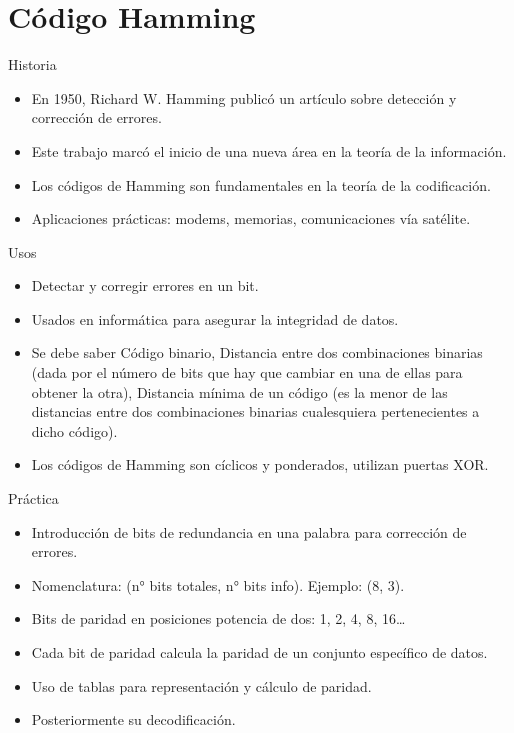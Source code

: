 \documentclass[presentation]{beamer}
\begin{document}
\section{Código Hamming}
\label{sec:orgc25531d}

\begin{frame}[label={sec:org75c1411}]{Historia}
\begin{itemize}
\item En 1950, Richard W. Hamming publicó un artículo sobre detección y corrección de errores.
\item Este trabajo marcó el inicio de una nueva área en la teoría de la información.
\item Los códigos de Hamming son fundamentales en la teoría de la codificación.
\item Aplicaciones prácticas: modems, memorias, comunicaciones vía satélite.
\end{itemize}
\end{frame}

\begin{frame}[label={sec:org9f31c41}]{Usos}
\begin{itemize}
\item Detectar y corregir errores en un bit.
\item Usados en informática para asegurar la integridad de datos.
\item Se debe saber Código binario, Distancia entre dos combinaciones binarias (dada por el número de bits que hay que cambiar en una de ellas para obtener la otra), Distancia mínima de un código (es la menor de las distancias entre dos combinaciones binarias cualesquiera pertenecientes a dicho código).
\item Los códigos de Hamming son cíclicos y ponderados, utilizan puertas XOR.
\end{itemize}
\end{frame}

\begin{frame}[label={sec:orgf139804}]{Práctica}
\begin{itemize}
\item Introducción de bits de redundancia en una palabra para corrección de errores.
\item Nomenclatura: (n° bits totales, n° bits info). Ejemplo: (8, 3).
\item Bits de paridad en posiciones potencia de dos: 1, 2, 4, 8, 16\ldots{}
\item Cada bit de paridad calcula la paridad de un conjunto específico de datos.
\item Uso de tablas para representación y cálculo de paridad.
\item Posteriormente su decodificación.
\end{itemize}
\end{frame}
\end{document}
